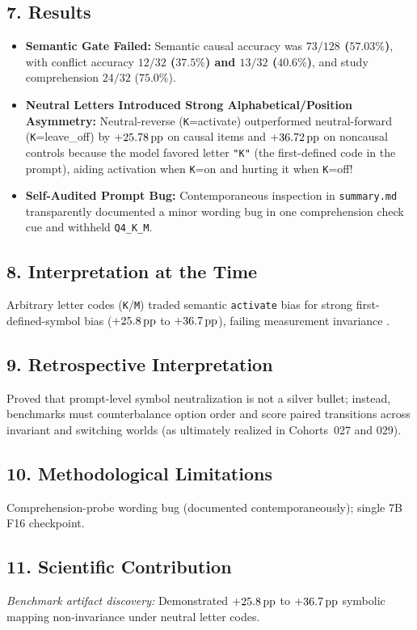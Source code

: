 \subsection*{7. Results}
\begin{itemize}
  \item \textbf{Semantic Gate Failed:} Semantic causal accuracy was \textbf{$73/128$ ($57.03\%$)}, with conflict accuracy \textbf{$12/32$ ($37.5\%$)\textbf{ and }$13/32$ ($40.6\%$)}, and study comprehension $24/32$ ($75.0\%$).
  \item \textbf{Neutral Letters Introduced Strong Alphabetical/Position Asymmetry:} Neutral-reverse (\texttt{K}=activate) outperformed neutral-forward (\texttt{K}=leave\_off) by \textbf{$+25.78\,\mathrm{pp}$} on causal items and \textbf{$+36.72\,\mathrm{pp}$} on noncausal controls because the model favored letter \texttt{"K"} (the first-defined code in the prompt), aiding activation when \texttt{K}=on and hurting it when \texttt{K}=off!
  \item \textbf{Self-Audited Prompt Bug:} Contemporaneous inspection in \texttt{summary.md} transparently documented a minor wording bug in one comprehension check cue and withheld \texttt{Q4\_K\_M}.
\end{itemize}

\subsection*{8. Interpretation at the Time}
Arbitrary letter codes (\texttt{K}/\texttt{M}) traded semantic \texttt{activate} bias for strong first-defined-symbol bias ($+25.8\,\mathrm{pp}$ to $+36.7\,\mathrm{pp}$), failing measurement invariance \citep{lohn2024machinepsychology}.

\subsection*{9. Retrospective Interpretation}
Proved that prompt-level symbol neutralization is not a silver bullet; instead, benchmarks must counterbalance option order and score paired transitions across invariant and switching worlds (as ultimately realized in Cohorts~027 and 029).

\subsection*{10. Methodological Limitations}
Comprehension-probe wording bug (documented contemporaneously); single 7B F16 checkpoint.

\subsection*{11. Scientific Contribution}
\emph{Benchmark artifact discovery:} Demonstrated $+25.8\,\mathrm{pp}$ to $+36.7\,\mathrm{pp}$ symbolic mapping non-invariance under neutral letter codes.

